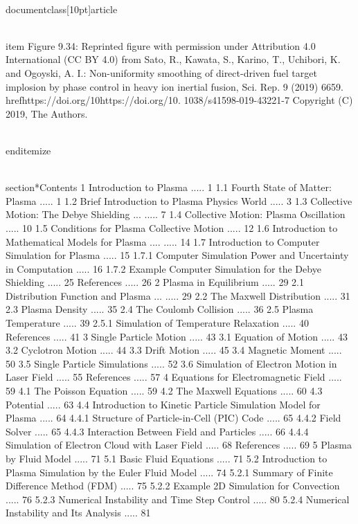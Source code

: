 \\documentclass[10pt]{article}
\begin{document}
  \\item Figure 9.34: Reprinted figure with permission under Attribution 4.0 International (CC BY 4.0) from Sato, R., Kawata, S., Karino, T., Uchibori, K. and Ogoyski, A. I.: Non-uniformity smoothing of direct-driven fuel target implosion by phase control in heavy ion inertial fusion, Sci. Rep. 9 (2019) 6659. \\href{https://doi.org/10}{https://doi.org/10}. 1038/s41598-019-43221-7 Copyright (C) 2019, The Authors.

\\end{itemize}

\\section*{Contents}
1 Introduction to Plasma ..... 1
1.1 Fourth State of Matter: Plasma ..... 1
1.2 Brief Introduction to Plasma Physics World ..... 3
1.3 Collective Motion: The Debye Shielding ... ..... 7
1.4 Collective Motion: Plasma Oscillation ..... 10
1.5 Conditions for Plasma Collective Motion ..... 12
1.6 Introduction to Mathematical Models for Plasma .... ..... 14
1.7 Introduction to Computer Simulation for Plasma ..... 15
1.7.1 Computer Simulation Power and Uncertainty in Computation ..... 16
1.7.2 Example Computer Simulation for the Debye Shielding ..... 25
References ..... 26
2 Plasma in Equilibrium ..... 29
2.1 Distribution Function and Plasma ... ..... 29
2.2 The Maxwell Distribution ..... 31
2.3 Plasma Density ..... 35
2.4 The Coulomb Collision ..... 36
2.5 Plasma Temperature ..... 39
2.5.1 Simulation of Temperature Relaxation ..... 40
References ..... 41
3 Single Particle Motion ..... 43
3.1 Equation of Motion ..... 43
3.2 Cyclotron Motion ..... 44
3.3 Drift Motion ..... 45
3.4 Magnetic Moment ..... 50
3.5 Single Particle Simulations ..... 52
3.6 Simulation of Electron Motion in Laser Field ..... 55
References ..... 57
4 Equations for Electromagnetic Field ..... 59
4.1 The Poisson Equation ..... 59
4.2 The Maxwell Equations ..... 60
4.3 Potential ..... 63
4.4 Introduction to Kinetic Particle Simulation Model for Plasma ..... 64
4.4.1 Structure of Particle-in-Cell (PIC) Code ..... 65
4.4.2 Field Solver ..... 65
4.4.3 Interaction Between Field and Particles ..... 66
4.4.4 Simulation of Electron Cloud with Laser Field ..... 68
References ..... 69
5 Plasma by Fluid Model ..... 71
5.1 Basic Fluid Equations ..... 71
5.2 Introduction to Plasma Simulation by the Euler Fluid Model ..... 74
5.2.1 Summary of Finite Difference Method (FDM) ..... 75
5.2.2 Example 2D Simulation for Convection ..... 76
5.2.3 Numerical Instability and Time Step Control ..... 80
5.2.4 Numerical Instability and Its Analysis ..... 81
\end{document}
